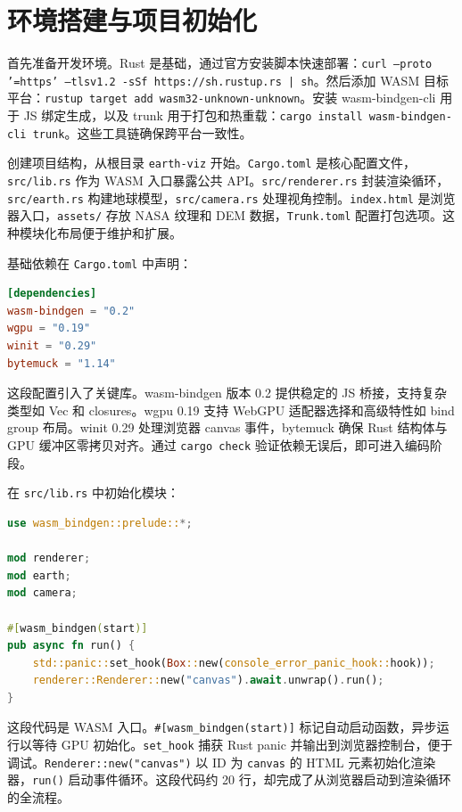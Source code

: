 \chapter{环境搭建与项目初始化}
首先准备开发环境。Rust 是基础，通过官方安装脚本快速部署：\texttt{curl --proto '=https' --tlsv1.2 -sSf https://sh.rustup.rs | sh}。然后添加 WASM 目标平台：\texttt{rustup target add wasm32-unknown-unknown}。安装 wasm-bindgen-cli 用于 JS 绑定生成，以及 trunk 用于打包和热重载：\texttt{cargo install wasm-bindgen-cli trunk}。这些工具链确保跨平台一致性。\par
创建项目结构，从根目录 \texttt{earth-viz} 开始。\texttt{Cargo.toml} 是核心配置文件，\texttt{src/lib.rs} 作为 WASM 入口暴露公共 API。\texttt{src/renderer.rs} 封装渲染循环，\texttt{src/earth.rs} 构建地球模型，\texttt{src/camera.rs} 处理视角控制。\texttt{index.html} 是浏览器入口，\texttt{assets/} 存放 NASA 纹理和 DEM 数据，\texttt{Trunk.toml} 配置打包选项。这种模块化布局便于维护和扩展。\par
基础依赖在 \texttt{Cargo.toml} 中声明：\par
\begin{lstlisting}[language=toml]
[dependencies]
wasm-bindgen = "0.2"
wgpu = "0.19"
winit = "0.29"
bytemuck = "1.14"
\end{lstlisting}
这段配置引入了关键库。wasm-bindgen 版本 0.2 提供稳定的 JS 桥接，支持复杂类型如 Vec 和 closures。wgpu 0.19 支持 WebGPU 适配器选择和高级特性如 bind group 布局。winit 0.29 处理浏览器 canvas 事件，bytemuck 确保 Rust 结构体与 GPU 缓冲区零拷贝对齐。通过 \texttt{cargo check} 验证依赖无误后，即可进入编码阶段。\par
在 \texttt{src/lib.rs} 中初始化模块：\par
\begin{lstlisting}[language=rust]
use wasm_bindgen::prelude::*;

mod renderer;
mod earth;
mod camera;

#[wasm_bindgen(start)]
pub async fn run() {
    std::panic::set_hook(Box::new(console_error_panic_hook::hook));
    renderer::Renderer::new("canvas").await.unwrap().run();
}
\end{lstlisting}
这段代码是 WASM 入口。\texttt{\#{}[wasm\_{}bindgen(start)]} 标记自动启动函数，异步运行以等待 GPU 初始化。\texttt{set\_{}hook} 捕获 Rust panic 并输出到浏览器控制台，便于调试。\texttt{Renderer::new("canvas")} 以 ID 为 \texttt{canvas} 的 HTML 元素初始化渲染器，\texttt{run()} 启动事件循环。这段代码约 20 行，却完成了从浏览器启动到渲染循环的全流程。\par
